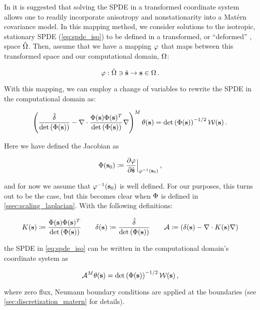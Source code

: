 In  it is suggested that solving the SPDE in a transformed
coordinate system allows one to readily incorporate anisotropy and
nonstationarity into a Mat\'ern covariance model.
In this mapping method, we consider solutions to the isotropic, stationary SPDE
(\ref{eq:spde_iso}) to be defined in a transformed, or
``deformed'' \citep{sampson_nonparametric_1992}, space $\hat{\Omega}$.
Then, assume that we have a mapping $\varphi$ that maps between this transformed space
and our computational domain, $\Omega$:
\begin{linenomath*}\begin{equation*}
    \varphi : \hat{\Omega}\ni\hat{\mathbf{s}} \rightarrow \mathbf{s}\in\Omega \, .
\end{equation*}\end{linenomath*}
With this mapping, we can employ a change of variables
\citep{smith_change_1934} to rewrite the SPDE in the computational domain as:
\begin{linenomath*}\begin{equation*}
    \left(\dfrac{\hat{\delta}}{\text{det}\left(\Phi(\mathbf{s})\right)} -
    \nabla\cdot
    \dfrac{\Phi(\mathbf{s})\Phi(\mathbf{s})^T}{\text{det}\left(\Phi(\mathbf{s})\right)}
    \nabla\right)^M\theta(\mathbf{s}) =
    \text{det}\left(\Phi(\mathbf{s})\right)^{-1/2}\mathcal{W}(\mathbf{s}) \, .
\end{equation*}\end{linenomath*}
Here we have defined the Jacobian as
\begin{linenomath*}\begin{equation*}
    \Phi(\mathbf{s}_0) \coloneqq
    \dfrac{\partial \varphi}{\partial \hat{\mathbf{s}}}\Big|_{\varphi^{-1}(\mathbf{s}_{0})} \, ,
\end{equation*}\end{linenomath*}
and for now we assume that $\varphi^{-1}(\mathbf{s}_0)$ is well defined.
For our purposes, this turns out to be the case, but this becomes clear when
$\Phi$ is defined in \cref{ssec:scaling_laplacian}.
With the following definitions:
\begin{linenomath*}\begin{equation}
        K(\mathbf{s}) \coloneqq
        \dfrac{\Phi(\mathbf{s})\Phi(\mathbf{s})^T}{\text{det}\left(\Phi(\mathbf{s})\right)}
        \qquad
        \delta(\mathbf{s}) \coloneqq \dfrac{\hat{\delta}}{\text{det}\left(\Phi(\mathbf{s})\right)}
        \qquad
        \mathcal{A} \coloneqq \left(\delta(\mathbf{s}) - \nabla\cdot K(\mathbf{s})\nabla\right)
    \label{eq:matern_definitions}
\end{equation}\end{linenomath*}
the SPDE in \cref{eq:spde_iso} can be written in the computational domain's coordinate system as
\begin{linenomath*}\begin{equation}
    \mathcal{A}^M \theta(\mathbf{s}) =
    \text{det}\left(\Phi(\mathbf{s})\right)^{-1/2}\mathcal{W}(\mathbf{s}) \, ,
    \label{eq:spde_general}
\end{equation}\end{linenomath*}
where zero flux, Neumann boundary conditions are applied at the boundaries
(see \cref{sec:discretization_matern} for details).

